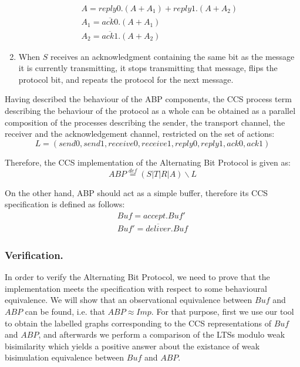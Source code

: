 \begin{enumerate}
        \begin{equation*}\label{trans_imp}
	      	\begin{array}{lcl}
						A=reply0.\left(A+A_{1}\right)+reply1.\left(A+A_{2}\right)\\
						A_{1}=\overline{ack0}.\left(A+A_{1}\right)\\
						A_{2}=\overline{ack1}.\left(A+A_{2}\right)
					\end{array}
				\end{equation*}
  \item When $S$ receives an acknowledgment containing the same bit as the message it is currently transmitting, it stops transmitting that message, flips the protocol bit, and repeats the protocol for the next message.\cite{Kulick}\cite{ProcessAlgebraParallel}
\end{enumerate}

Having described the behaviour of the ABP components, the CCS process term describing the behaviour of the protocol as a whole can be obtained as a parallel composition of the processes describing the sender, the transport channel, the receiver and the acknowledgement channel, restricted on the set of actions:
\begin{equation*}
  L = \left(send0,send1,receive0,receive1,reply0,reply1,ack0,ack1\right)
\end{equation*}

Therefore, the CCS implementation of the Alternating Bit Protocol is given as:
\begin{equation}\label{abp_imp}
	\mathit{ABP} \stackrel{def}{=}\left(S|T|R|A\right)\backslash L
\end{equation}

On the other hand, ABP should act as a simple buffer, therefore its CCS specification is defined as follows:
\begin{equation}\label{eq:abp_spec}
	\begin{array}{lcl}
		\mathit{Buf} = \mathit{accept.Buf'}\\
		\mathit{Buf'} = \mathit{\overline{deliver}.Buf}
	\end{array}
\end{equation}

\subsubsection{Verification.} In order to verify the Alternating Bit Protocol, we need to prove that the implementation meets the specification with respect to some behavioural equivalence. We will show that an observational equivalence between $\mathit{Buf}$ and $\mathit{ABP}$ can be found, i.e. that $\mathit{ABP}\approx \mathit{Imp}$. For that purpose, first we use our tool to obtain the labelled graphs corresponding to the CCS representations of $\mathit{Buf}$ and $\mathit{ABP}$, and afterwards we perform a comparison of the LTSs modulo weak bisimilarity which yields a positive answer about the existance of weak bisimulation equivalence between $\mathit{Buf}$ and $\mathit{ABP}$.

